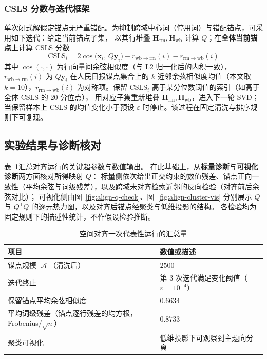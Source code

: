 \documentclass[withoutpreface]{cumcmthesis}
\begin{document}
\subsubsection{CSLS 分数与迭代框架}
单次闭式解假定锚点无严重错配。为抑制跨域中心词（停用词）与错配锚点，可采用如下迭代：给定当前锚点子集，
以其行堆叠 $\mathbf{H}_{\mathrm{rm}},\mathbf{H}_{\mathrm{wb}}$ 计算 $Q$；在\textbf{全体当前锚点}上计算 CSLS 分数
\begin{equation}
  \mathrm{CSLS}_i
  = 2\cos\!\bigl(\mathbf{x}_i,\,Q\mathbf{y}_i\bigr)
    - r_{\mathrm{wb}\to\mathrm{rm}}(i) - r_{\mathrm{rm}\to\mathrm{wb}}(i) 
\end{equation}
其中 $\cos(\cdot,\cdot)$ 为行向量间余弦相似度（与 L2 归一化后的内积一致），$r_{\mathrm{wb}\to\mathrm{rm}}(i)$ 为
 $Q\mathbf{y}_i$ 在人民日报锚点集合上的 $k$ 近邻余弦相似度均值（本文取 $k=10$），$r_{\mathrm{rm}\to\mathrm{wb}}(i)$ 
 为对称项。保留 $\mathrm{CSLS}_i$ 高于某分位数阈值的索引（如高于全体 $\mathrm{CSLS}$ 的 $20$ 分位点），
 用对应子集重新堆叠 $\mathbf{H}_{\mathrm{rm}},\mathbf{H}_{\mathrm{wb}}$，进入下一轮 SVD；
 当保留样本上 CSLS 的均值变化小于预设 $\varepsilon$ 时停止。该过程在固定清洗与排序规则下可复现。


\subsection{实验结果与诊断核对}

表~\ref{tab:align-run}汇总对齐运行的关键超参数与数值输出。
在此基础上，从\textbf{标量诊断}与\textbf{可视化诊断}两方面核对所得映射 $Q$：
标量侧依次给出正交约束的数值残差、锚点正向一致性（平均余弦与词级残差），以及跨域未对齐检索近邻的反向检验（对齐前后余弦对比）；
可视化侧由图~\ref{fig:align-q-check}、图~\ref{fig:align-cluster-vis}
分别展示 $Q$ 与 $Q^{\mathsf{T}}Q$ 的逐元热力图，以及对齐后锚点经聚类与低维投影的结构。
各检验均为固定规则下的描述性统计，不作假设检验推断。

\begin{table}[!htbp]
  \centering
  \caption{空间对齐一次代表性运行的汇总量}
  \label{tab:align-run}
  \begin{tabular}{@{}ll@{}}
    \toprule
    项目 & 数值或描述 \\
    \midrule
    锚点规模 $|\mathcal{A}|$（清洗后） & $2500$ \\
    迭代终止 & 第 $3$ 次迭代满足变化阈值（$\varepsilon=10^{-4}$） \\
    保留锚点平均余弦相似度 & $0.6634$ \\
    平均词级残差（锚点逐行残差的均方根，Frobenius/$\sqrt{n}$） & $0.8733$ \\
    聚类可视化 & 低维投影下可观察到主题向分离 \\
    \bottomrule
  \end{tabular}
\end{table}
\end{document}
